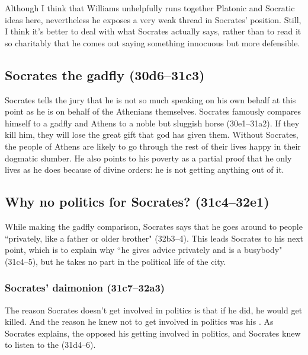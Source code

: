 \documentclass[11pt]{article}
\begin{document}
Although I think that Williams unhelpfully runs together Platonic and Socratic ideas here, nevertheless he exposes a very weak thread in Socrates' position.  Still, I think it's better to deal with what Socrates actually says, rather than to read it so charitably that he comes out saying something innocuous but more defensible.


\subsection{Socrates the gadfly (30d6--31c3)}

Socrates tells the jury that he is not so much speaking on his own behalf at this point as he is on behalf of the Athenians themselves.  Socrates famously compares himself to a gadfly and Athens to a noble but sluggish horse (30e1--31a2).  If they kill him, they will lose the great gift that god has given them.  Without Socrates, the people of Athens are likely to go through the rest of their lives happy in their dogmatic slumber.  He also points to his poverty as a partial proof that he only lives as he does because of divine orders: he is not getting anything out of it.


\subsection{Why no politics for Socrates? (31c4--32e1)}

While making the gadfly comparison, Socrates says that he goes around to people ``privately, like a father or older brother" (32b3--4).  This leads Socrates to his next point, which is to explain why ``he gives advice privately and is a busybody" (31c4--5), but he takes no part in the political life of the city.


\subsubsection{Socrates' daimonion (31c7--32a3)}

The reason Socrates doesn't get involved in politics is that if he did, he would get killed.  And the reason he knew not to get involved in politics was his .  As Socrates explains, the  opposed his getting involved in politics, and Socrates knew to listen to the  (31d4--6).
\end{document}

